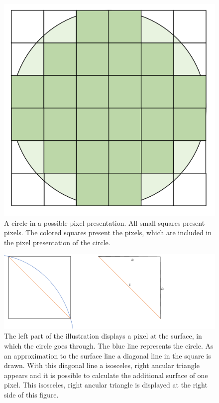 \begin{figure}
	\center
	\includegraphics[scale=0.15]{figures/PixelCircleSquare.png}
	\caption{A circle in a possible pixel presentation. All small squares present pixels. The colored squares present the pixels, which are included in the pixel presentation of the circle.}
	\label{img:CircleSquarePixels}
\end{figure}

\begin{figure}
	\center
	\includegraphics[scale=0.3]{figures/SurfaceApproximationSQRT2.png}
	\caption{The left part of the illustration displays a pixel at the surface, in which the circle goes through. The blue line represents the circle. As an approximation to the surface line a diagonal line in the square is drawn. With this diagonal line a isosceles, right ancular triangle appears and it is possible to calculate the additional surface of one pixel. This isosceles, right ancular triangle is displayed at the right side of this figure.}
	\label{img:ApproximationSQRT2}
\end{figure}

